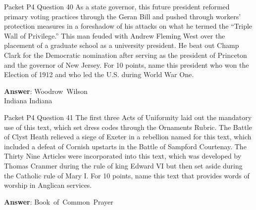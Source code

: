 \begin{frame}{Packet P4 Question 40}
As a state governor, this   future president reformed primary voting practices through the Geran Bill and pushed through workers’ protection measures in a foreshadow of his attacks on what he termed the “Triple Wall of Privilege.” This man feuded with Andrew Fleming West over the placement of a graduate school as a university president. He beat out Champ Clark for the Democratic nomination after serving as the president of Princeton and the governor of New Jersey. For 10 points, name this president       who won the Election of 1912 and who led the U.S. during World War One.  

\textbf{Answer}: Woodrow\ Wilson\\
 Indiana
 Indiana
\end{frame}

\begin{frame}{Packet P4 Question 41}
The first three Acts of Uniformity laid out the mandatory use of this text, which set dress codes through the Ornaments Rubric. The Battle of Clyst Heath relieved a siege of Exeter in a rebellion named   for this text, which included a defeat of Cornish upstarts in the Battle of Sampford   Courtenay. The   Thirty Nine Articles were incorporated into this text, which   was developed by Thomas Cranmer during the rule of king Edward VI but then set aside during the Catholic rule of Mary I. For 10 points, name this text that provides words of worship in Anglican services.

\textbf{Answer}: Book\ of\ Common\ Prayer\\
\end{frame}

